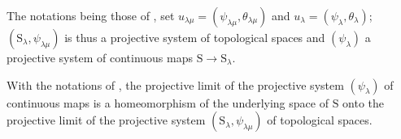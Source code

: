 \begin{env}[8.2.8]
\label{IV.8.2.8}
The notations being those of , set $u_{\lambda\mu}=(\psi_{\lambda\mu},\theta_{\lambda\mu})$ and $u_\lambda=(\psi_\lambda,\theta_\lambda)$; $(\mathrm{S}_\lambda,\psi_{\lambda\mu})$ is thus a projective system of topological spaces and $(\psi_\lambda)$ a projective system of continuous maps $\mathrm{S}\to\mathrm{S}_\lambda$.
\end{env}

\begin{proposition}[8.2.9]
\label{IV.8.2.9}
With the notations of , the projective limit of the projective system $(\psi_\lambda)$ of continuous maps is a homeomorphism of the underlying space of $\mathrm{S}$ onto the projective limit of the projective system $(\mathrm{S}_\lambda,\psi_{\lambda\mu})$ of topological spaces.
\end{proposition}

